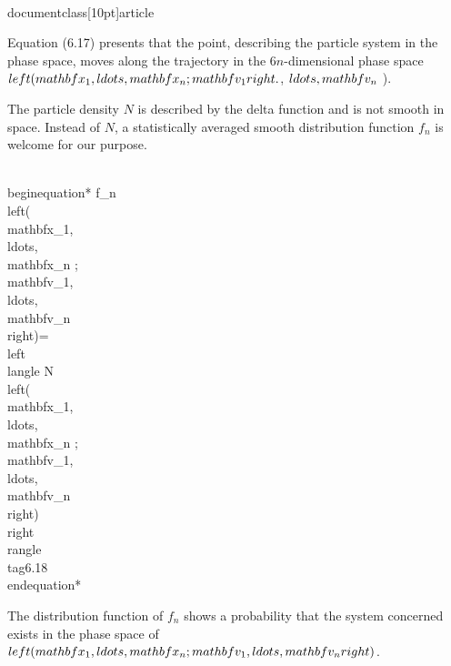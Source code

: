 \\documentclass[10pt]{article}
\begin{document}
{{{{Equation (6.17) presents that the point, describing the particle system in the phase space, moves along the trajectory in the $6 n$-dimensional phase space $\\left(\\mathbf{x}_{1}, \\ldots, \\mathbf{x}_{n} ; \\mathbf{v}_{1}\\right.$, $\\ldots, \\mathbf{v}_{n}$ ).

The particle density $N$ is described by the delta function and is not smooth in space. Instead of $N$, a statistically averaged smooth distribution function $f_{n}$ is welcome for our purpose.


\\begin{equation*}
f_{n}\\left(\\mathbf{x}_{1}, \\ldots, \\mathbf{x}_{n} ; \\mathbf{v}_{1}, \\ldots, \\mathbf{v}_{n}\\right)=\\left\\langle N\\left(\\mathbf{x}_{1}, \\ldots, \\mathbf{x}_{n} ; \\mathbf{v}_{1}, \\ldots, \\mathbf{v}_{n}\\right)\\right\\rangle \\tag{6.18}
\\end{equation*}


The distribution function of $f_{n}$ shows a probability that the system concerned exists in the phase space of $\\left(\\mathbf{x}_{1}, \\ldots, \\mathbf{x}_{n} ; \\mathbf{v}_{1}, \\ldots, \\mathbf{v}_{n}\\right)$.

}}}}
\end{document}
